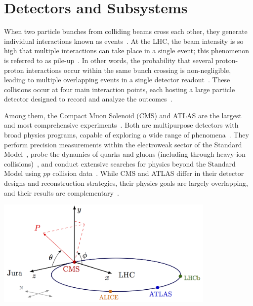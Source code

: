 \section{Detectors and Subsystems}\label{sec:detectors}

When two particle bunches from colliding beams cross each other, they generate individual interactions known as events~\cite{CMS:2008xjf,ATLAS:2008xda}. At the LHC, the beam intensity is so high that multiple interactions can take place in a single event; this phenomenon is referred to as pile-up~\cite{Apollinari2017_HLLHC,Bertolini:2014}. In other words, the probability that several proton-proton interactions occur within the same bunch crossing is non-negligible, leading to multiple overlapping events in a single detector readout~\cite{Cacciari:2011ma,Cacciari:2008gp}. These collisions occur at four main interaction points, each hosting a large particle detector designed to record and analyze the outcomes~\cite{CMS:2008xjf,ATLAS:2008xda}. 

Among them, the Compact Muon Solenoid (CMS) and ATLAS are the largest and most comprehensive experiments~\cite{CMS:2008xjf,ATLAS:2008xda}. Both are multipurpose detectors with broad physics programs, capable of exploring a wide range of phenomena~\cite{CMS:2008xjf,ATLAS:2008xda}. They perform precision measurements within the electroweak sector of the Standard Model~\cite{1674-1137-40-10-100001}, probe the dynamics of quarks and gluons (including through heavy-ion collisions)~\cite{deFavereau:2013fsa}, and conduct extensive searches for physics beyond the Standard Model using $pp$ collision data~\cite{CMS:2012gu,ATLAS:2012yve}. While CMS and ATLAS differ in their detector designs and reconstruction strategies, their physics goals are largely overlapping, and their results are complementary~\cite{CMS:2008xjf,ATLAS:2008xda}.


\begin{center}
    \includegraphics[width=0.8\textwidth]{Images/coordinatechart.png}
    \label{fig_coordinates}
\end{center}


